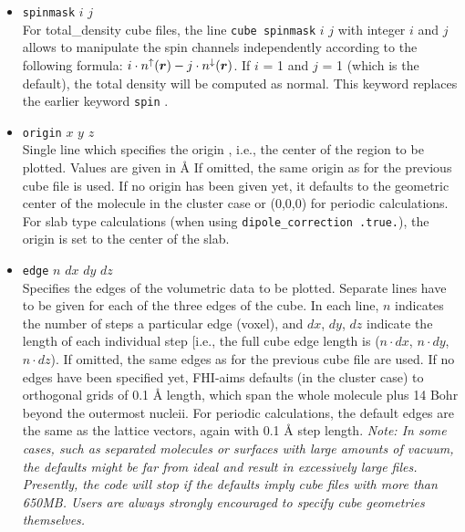 \begin{itemize}
\item {} \texttt{spinmask} $i$ $j$ \\
For total\_density cube files, the line \texttt{cube spinmask}
    $i$ $j$ with integer $i$ and $j$ allows to manipulate the spin channels
    independently according to the following formula: $i\cdot n^\uparrow(\mbox{\boldmath$r$})
    - j\cdot n^\downarrow(\mbox{\boldmath$r$})$. If $i$ = 1 and $j$ = 1 (which is the default),
    the total density will be computed as normal. 
    This keyword replaces the earlier keyword  \texttt{spin} .

\item {} \texttt{origin} $x$ $y$ $z$ \\
Single line which specifies the origin , i.e., the center of the region to be plotted. Values are given in \AA
If omitted, the same origin as for the previous cube file is used. If
no origin has been given yet, it defaults to the geometric center of
the molecule in the cluster case or (0,0,0) for periodic
calculations. For slab type calculations (when using
\texttt{dipole\_correction .true.}), the origin is set to the center
of the slab.  

\item {} \texttt{edge} $n$ $dx$ $dy$ $dz$ \\
Specifies the edges of the volumetric data to be plotted. Separate
lines have to be given for each of the three edges of the cube. In
each line, $n$ indicates the number of steps a particular edge
(voxel), and $dx$, $dy$, $dz$ indicate the length of each individual
step [i.e., the full cube edge length is ($n\cdot dx$, $n\cdot dy$,
  $n\cdot dz$). If omitted, the same edges as for the previous cube
  file are used. If no edges have been specified yet, FHI-aims
  defaults (in the cluster case) to orthogonal grids of 0.1 {\AA}
  length, which span the whole molecule plus 14 Bohr beyond the
  outermost nucleii. For periodic calculations, the default edges
  are the same as the lattice vectors, again with 0.1 {\AA} step
  length. \emph{Note: In some cases, such as separated molecules or
    surfaces with large amounts of vacuum, the defaults might be far
    from ideal and result in excessively large files.  Presently, the
    code will stop if the defaults imply cube files with more than
    650MB. Users are \emph{always} strongly encouraged to specify  
    cube geometries themselves. } 
\end{itemize}

